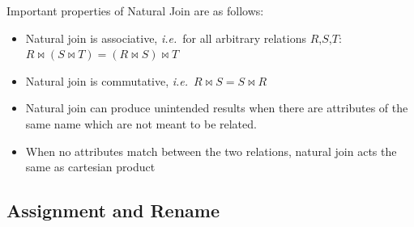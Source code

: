 \documentclass{report}
\begin{document}
         \vspace{.5cm}
         

        
        \par Important properties of Natural Join are as follows:
        \begin{itemize}
            \item Natural join is associative, \textit{i.e.}\  for all arbitrary relations $R$,$S$,$T$: $R\bowtie (S \bowtie T) = (R\bowtie S) \bowtie T$
            \item Natural join is commutative, \textit{i.e.}\ $R\bowtie S = S \bowtie R$
            \item Natural join can produce unintended results when there are attributes of the same name which are not meant to be related.
            \item When no attributes match between the two relations, natural join acts the same as cartesian product
        \end{itemize}


        \subsection{Assignment and Rename}
\end{document}

